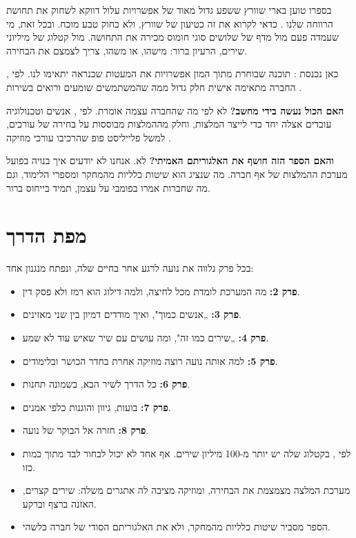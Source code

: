 בספרו  טוען בארי שוורץ ששפע גדול מאוד של אפשרויות עלול דווקא לשחוק את תחושת הרווחה שלנו \cite{schwartz2004paradox}. כדאי לקרוא את זה כטיעון של שוורץ, ולא כחוק טבע מוכח. ובכל זאת, מי שעמדה פעם מול מדף של שלושים סוגי חומוס מכירה את התחושה. מול קטלוג של מיליוני שירים, הרעיון ברור: מישהו, או משהו, צריך לצמצם את הבחירה.

כאן נכנסת : תוכנה שבוחרת מתוך המון אפשרויות את המעטות שכנראה יתאימו לנו. לפי , החברה מתאימה אישית חלק גדול ממה שהמשתמשים שומעים ורואים בשירות \cite{spotify2026understanding}.

\begin{realitycheck}
\textbf{האם הכול נעשה בידי מחשב?} לא לפי מה שהחברה עצמה אומרת. לפי , אנשים וטכנולוגיה עובדים אצלה יחד כדי לייצר המלצות, וחלק מההמלצות מבוססות על בחירה של עורכים, למשל פלייליסט פופ שהרכיבו עורכי מוזיקה \cite{spotify2026understanding}.

\textbf{והאם הספר הזה חושף את האלגוריתם האמיתי?} לא. אנחנו לא יודעים איך בנויה בפועל מערכת ההמלצות של אף חברה. מה שנציג הוא שיטות כלליות מהמחקר ומספרי הלימוד, וגם מה שחברות אמרו בפומבי על עצמן, תמיד בייחוס ברור.
\end{realitycheck}

\section{מפת הדרך}

בכל פרק נלווה את נועה לרגע אחר בחיים שלה, ונפתח מנגנון אחד:
\begin{itemize}
  \item \textbf{פרק 2:} מה המערכת לומדת מכל לחיצה, ולמה דילוג הוא רמז ולא פסק דין.
  \item \textbf{פרק 3:} „אנשים כמוך", ואיך מודדים דמיון בין שני מאזינים.
  \item \textbf{פרק 4:} „שירים כמו זה", ומה עושים עם שיר שאיש עוד לא שמע.
  \item \textbf{פרק 5:} למה אותה נועה רוצה מוזיקה אחרת בחדר הכושר ובלימודים.
  \item \textbf{פרק 6:} כל הדרך לשיר הבא, בשמונה תחנות.
  \item \textbf{פרק 7:} בועות, גיוון והוגנות כלפי אמנים.
  \item \textbf{פרק 8:} חזרה אל הבוקר של נועה.
\end{itemize}

\begin{inshort}
\begin{itemize}
  \item לפי , בקטלוג שלה יש יותר מ-100 מיליון שירים. אף אחד לא יכול לבחור לבד מתוך כמות כזו.
  \item מערכת המלצה מצמצמת את הבחירה, ומוזיקה מציבה לה אתגרים משלה: שירים קצרים, האזנה ברצף וברקע.
  \item הספר מסביר שיטות כלליות מהמחקר, ולא את האלגוריתם הסודי של חברה כלשהי.
\end{itemize}
\end{inshort}
